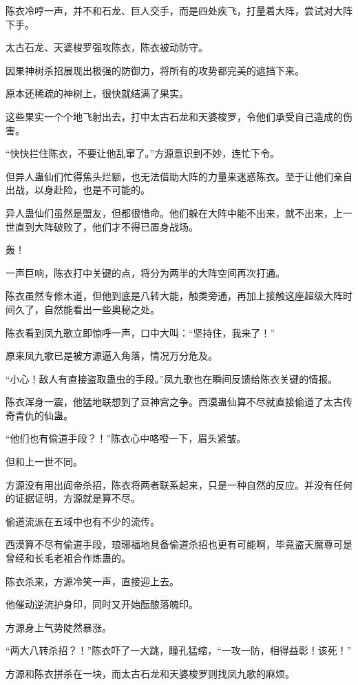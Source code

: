\begin{this_body}
陈衣冷哼一声，并不和石龙、巨人交手，而是四处疾飞，打量着大阵，尝试对大阵下手。

太古石龙、天婆梭罗强攻陈衣，陈衣被动防守。

因果神树杀招展现出极强的防御力，将所有的攻势都完美的遮挡下来。

原本还稀疏的神树上，很快就结满了果实。

这些果实一个个地飞射出去，打中太古石龙和天婆梭罗，令他们承受自己造成的伤害。

“快快拦住陈衣，不要让他乱窜了。”方源意识到不妙，连忙下令。

但异人蛊仙们忙得焦头烂额，也无法借助大阵的力量来迷惑陈衣。至于让他们亲自出战，以身赴险，也是不可能的。

异人蛊仙们虽然是盟友，但都很惜命。他们躲在大阵中能不出来，就不出来，上一世直到大阵破败了，他们才不得已置身战场。

轰！

一声巨响，陈衣打中关键的点，将分为两半的大阵空间再次打通。

陈衣虽然专修木道，但他到底是八转大能，触类旁通，再加上接触这座超级大阵时间久了，自然能看出一些奥秘之处。

陈衣看到凤九歌立即惊呼一声，口中大叫：“坚持住，我来了！”

原来凤九歌已是被方源逼入角落，情况万分危及。

“小心！敌人有直接盗取蛊虫的手段。”凤九歌也在瞬间反馈给陈衣关键的情报。

陈衣浑身一震，他猛地联想到了豆神宫之争。西漠蛊仙算不尽就直接偷道了太古传奇青仇的仙蛊。

“他们也有偷道手段？！”陈衣心中咯噔一下，眉头紧皱。

但和上一世不同。

方源没有用出阎帝杀招，陈衣将两者联系起来，只是一种自然的反应。并没有任何的证据证明，方源就是算不尽。

偷道流派在五域中也有不少的流传。

西漠算不尽有偷道手段，琅琊福地具备偷道杀招也更有可能啊，毕竟盗天魔尊可是曾经和长毛老祖合作炼蛊的。

陈衣杀来，方源冷笑一声，直接迎上去。

他催动逆流护身印，同时又开始酝酿落魄印。

方源身上气势陡然暴涨。

“两大八转杀招？！”陈衣吓了一大跳，瞳孔猛缩，“一攻一防，相得益彰！该死！”

方源和陈衣拼杀在一块，而太古石龙和天婆梭罗则找凤九歌的麻烦。


\end{this_body}
